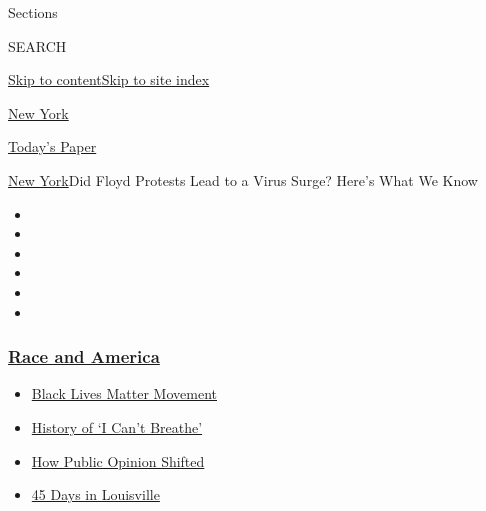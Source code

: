 Sections

SEARCH

\protect\hyperlink{site-content}{Skip to
content}\protect\hyperlink{site-index}{Skip to site index}

\href{https://www.nytimes3xbfgragh.onion/section/nyregion}{New York}

\href{https://myaccount.nytimes3xbfgragh.onion/auth/login?response_type=cookie\&client_id=vi}{}

\href{https://www.nytimes3xbfgragh.onion/section/todayspaper}{Today's
Paper}

\href{/section/nyregion}{New York}\textbar{}Did Floyd Protests Lead to a
Virus Surge? Here's What We Know

\begin{itemize}
\item
\item
\item
\item
\item
\item
\end{itemize}

\hypertarget{race-and-america}{%
\subsubsection{\texorpdfstring{\href{https://www.nytimes3xbfgragh.onion/news-event/george-floyd-protests-minneapolis-new-york-los-angeles?name=styln-george-floyd\&region=TOP_BANNER\&variant=undefined\&block=storyline_menu_recirc\&action=click\&pgtype=Article\&impression_id=3c863890-e38b-11ea-9e28-3b2d4f74ce95}{Race
and America}}{Race and America}}\label{race-and-america}}

\begin{itemize}
\tightlist
\item
  \href{https://www.nytimes3xbfgragh.onion/interactive/2020/07/03/us/george-floyd-protests-crowd-size.html?name=styln-george-floyd\&region=TOP_BANNER\&variant=undefined\&block=storyline_menu_recirc\&action=click\&pgtype=Article\&impression_id=3c8686b0-e38b-11ea-9e28-3b2d4f74ce95}{Black
  Lives Matter Movement}
\item
  \href{https://www.nytimes3xbfgragh.onion/interactive/2020/06/28/us/i-cant-breathe-police-arrest.html?name=styln-george-floyd\&region=TOP_BANNER\&variant=undefined\&block=storyline_menu_recirc\&action=click\&pgtype=Article\&impression_id=3c86adc0-e38b-11ea-9e28-3b2d4f74ce95}{History
  of `I Can't Breathe'}
\item
  \href{https://www.nytimes3xbfgragh.onion/interactive/2020/06/10/upshot/black-lives-matter-attitudes.html?name=styln-george-floyd\&region=TOP_BANNER\&variant=undefined\&block=storyline_menu_recirc\&action=click\&pgtype=Article\&impression_id=3c86adc1-e38b-11ea-9e28-3b2d4f74ce95}{How
  Public Opinion Shifted}
\item
  \href{https://www.nytimes3xbfgragh.onion/interactive/2020/07/16/us/black-lives-matter-protests-louisville-breonna-taylor.html?name=styln-george-floyd\&region=TOP_BANNER\&variant=undefined\&block=storyline_menu_recirc\&action=click\&pgtype=Article\&impression_id=3c86adc2-e38b-11ea-9e28-3b2d4f74ce95}{45
  Days in Louisville}
\end{itemize}

